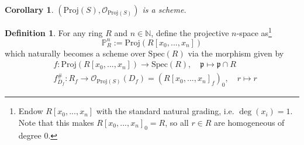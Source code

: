 \documentclass{scrartcl}
\newcommand{\N}{\mathbb{N}}
\renewcommand{\P}{\mathbb{P}}
\newcommand{\p}{\mathfrak{p}}
\newcommand{\Spec}{\mathrm{Spec}}
\newcommand{\Proj}{\mathrm{Proj}}
\renewcommand{\O}{\mathcal{O}}
\newtheorem{corollary}[prop]{Corollary}
\theoremstyle{definition}
\newtheorem{definition}[prop]{Definition}
\begin{document}
\begin{corollary}
    $(\Proj(S), \O_{\Proj(S)})$ is a scheme.
\end{corollary}
\begin{definition}
    For any ring $R$ and $n \in \N$, define the projective $n$-space as\footnote{Endow $R[x_0, ..., x_n]$ with the standard natural grading, i.e. $\deg(x_i) = 1$. Note that this makes $R[x_0, ..., x_n]_0 = R$, so all $r \in R$ are homogeneous of degree $0$.}
    \begin{equation*}
        \P_R^n := \Proj(R[x_0, ..., x_n])
    \end{equation*}
    which naturally becomes a scheme over $\Spec(R)$ via the morphism given by
    \begin{align*}
        &f: \Proj(R[x_0, ..., x_n]) \to \Spec(R), \quad \p \mapsto \p \cap R \\
        &f^\#_{D_f}: R_f \to \O_{\Proj(S)}(D_f) = (R[x_0, ..., x_n]_f)_0, \quad r \mapsto r
    \end{align*}
\end{definition}
\end{document}
